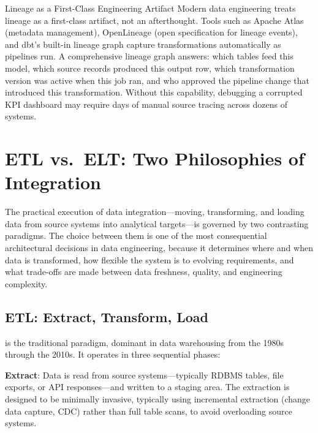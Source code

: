 \begin{keyinsight}{Lineage as a First-Class Engineering Artifact}
Modern data engineering treats lineage as a first-class artifact, not
an afterthought. Tools such as Apache Atlas (metadata management),
OpenLineage (open specification for lineage events), and dbt's built-in
lineage graph capture transformations automatically as pipelines run.
A comprehensive lineage graph answers: which tables feed this model,
which source records produced this output row, which transformation
version was active when this job ran, and who approved the pipeline
change that introduced this transformation. Without this capability,
debugging a corrupted KPI dashboard may require days of manual source
tracing across dozens of systems.
\end{keyinsight}

\section{ETL vs.\ ELT: Two Philosophies of Integration}
\label{sec:etl-elt}

The practical execution of data integration---moving, transforming, and
loading data from source systems into analytical targets---is governed
by two contrasting paradigms. The choice between them is one of the most
consequential architectural decisions in data engineering, because it
determines where and when data is transformed, how flexible the system
is to evolving requirements, and what trade-offs are made between data
freshness, quality, and engineering complexity.

\subsection{ETL: Extract, Transform, Load}
\label{subsec:etl}

 is the traditional paradigm, dominant in data warehousing
from the 1980s through the 2010s. It operates in three sequential
phases:

\textbf{Extract}: Data is read from source systems---typically RDBMS
tables, file exports, or API responses---and written to a staging area.
The extraction is designed to be minimally invasive, typically using
incremental extraction (change data capture, CDC) rather than full table
scans, to avoid overloading source systems.

